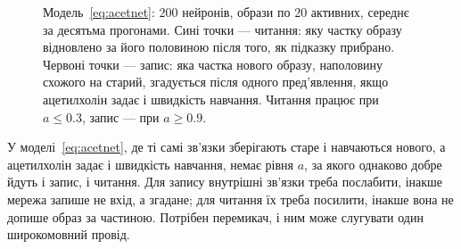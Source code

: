 \begin{figure}[t]
\centering
{}
\caption{Модель~\eqref{eq:acetnet}: $200$ нейронів, образи по $20$ активних, середнє за десятьма прогонами. Сині точки --- читання: яку частку образу відновлено за його половиною після того, як підказку прибрано. Червоні точки --- запис: яка частка нового образу, наполовину схожого на старий, згадується після одного пред'явлення, якщо ацетилхолін задає і швидкість навчання. Читання працює при $a\le0.3$, запис --- при $a\ge0.9$.}
\label{fig:acetsim}
\end{figure}

\begin{keyblock}
\begin{proposition}
\label{prop:writeread}
У моделі~\eqref{eq:acetnet}, де ті самі зв'язки зберігають старе і навчаються нового, а ацетилхолін задає і швидкість навчання, немає рівня $a$, за якого однаково добре йдуть і запис, і читання. Для запису внутрішні зв'язки треба послабити, інакше мережа запише не вхід, а згадане; для читання їх треба посилити, інакше вона не допише образ за частиною. Потрібен перемикач, і ним може слугувати один широкомовний провід.
\end{proposition}
\end{keyblock}

